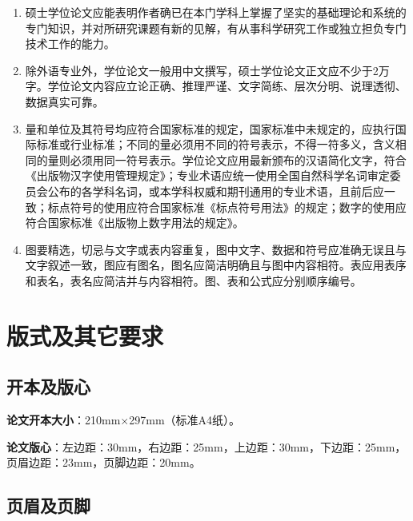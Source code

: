 \begin{enumerate}[label=\arabic*)]
	\item 硕士学位论文应能表明作者确已在本门学科上掌握了坚实的基础理论和系统的专门知识，并对所研究课题有新的见解，有从事科学研究工作或独立担负专门技术工作的能力。
	
	\item 除外语专业外，学位论文一般用中文撰写，硕士学位论文正文应不少于2万字。学位论文内容应立论正确、推理严谨、文字简练、层次分明、说理透彻、数据真实可靠。
	
	\item 量和单位及其符号均应符合国家标准的规定，国家标准中未规定的，应执行国际标准或行业标准；不同的量必须用不同的符号表示，不得一符多义，含义相同的量则必须用同一符号表示。学位论文应用最新颁布的汉语简化文字，符合《出版物汉字使用管理规定》；专业术语应统一使用全国自然科学名词审定委员会公布的各学科名词，或本学科权威和期刊通用的专业术语，且前后应一致；标点符号的使用应符合国家标准《标点符号用法》的规定；数字的使用应符合国家标准《出版物上数字用法的规定》。
	
	\item 图要精选，切忌与文字或表内容重复，图中文字、数据和符号应准确无误且与文字叙述一致，图应有图名，图名应简洁明确且与图中内容相符。表应用表序和表名，表名应简洁并与内容相符。图、表和公式应分别顺序编号。
\end{enumerate}

\section{版式及其它要求}

\subsection{开本及版心}
{\bfseries 论文开本大小}：210mm$\times$297mm（标准A4纸）。

{\bfseries 论文版心}：左边距：30mm，右边距：25mm，上边距：30mm，下边距：25mm，页眉边距：23mm，页脚边距：20mm。

\subsection{页眉及页脚}\label{sec:error}

